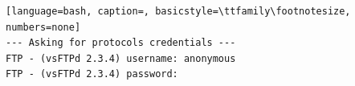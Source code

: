 \documentclass[12pt]{report}
\begin{document}
\begin{lstlisting}[language=bash, caption=, basicstyle=\ttfamily\footnotesize, numbers=none]
--- Asking for protocols credentials ---                                                                                                                                                                             
FTP - (vsFTPd 2.3.4) username: anonymous                                                                                                                                                                             
FTP - (vsFTPd 2.3.4) password:                                                                                                                                                                                       
                                                                                                                                                                                                                     

\end{lstlisting}
\end{document}
